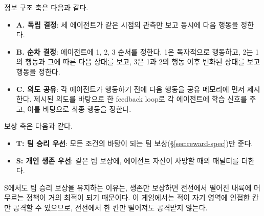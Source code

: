 \documentclass[11pt,a4paper]{article}
\begin{document}
정보 구조 축은 다음과 같다.
\begin{itemize}
 \item \textbf{A. 독립 결정}: 세 에이전트가 같은 시점의 관측만 보고 동시에 다음 행동을 정한다.
 \item \textbf{B. 순차 결정}: 에이전트에 1, 2, 3 순서를 정한다. 1은 독자적으로 행동하고, 2는 1의 행동과 그에 따른 다음 상태를 보고, 3은 1과 2의 행동 이후 변화된 상태를 보고 행동을 정한다.
 \item \textbf{C. 의도 공유}: 각 에이전트가 행동하기 전에 다음 행동을 공유 메모리에 먼저 제시한다. 제시된 의도를 바탕으로 한 feedback loop로 각 에이전트에 학습 신호를 주고, 이를 바탕으로 최종 행동을 정한다.
\end{itemize}
보상 축은 다음과 같다.
\begin{itemize}
 \item \textbf{T: 팀 승리 우선}: 모든 조건의 바탕이 되는 팀 보상(\S\ref{sec:reward-spec})만 준다.
 \item \textbf{S: 개인 생존 우선}: 같은 팀 보상에, 에이전트 자신이 사망할 때의 패널티를 더한다.
\end{itemize}
S에서도 팀 승리 보상을 유지하는 이유는, 생존만 보상하면 전선에서 떨어진 내륙에 머무르는 정책이 거의 최적이 되기 때문이다. 이 게임에서는 적이 자기 영역에 인접한 칸만 공격할 수 있으므로, 전선에서 한 칸만 떨어져도 공격받지 않는다.
\end{document}
